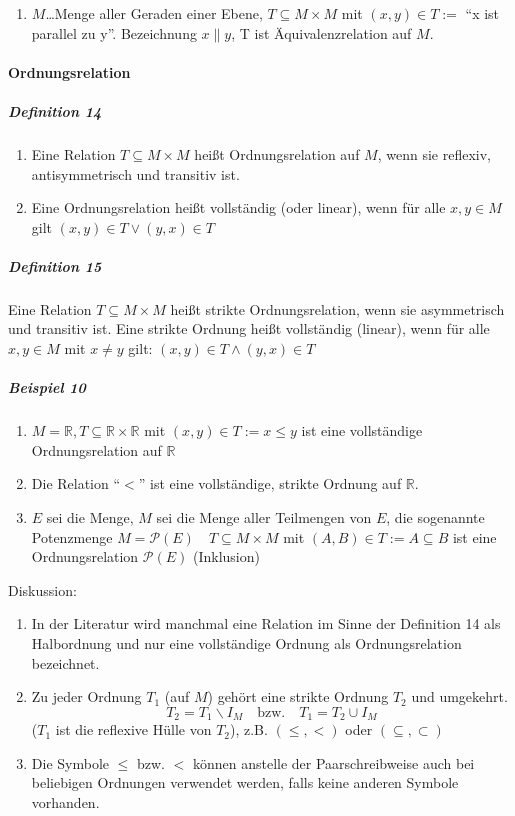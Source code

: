 \documentclass[a4paper]{scrartcl}
\begin{document}
\begin{enumerate}
\begin{enumerate}
\item $M$\dots Menge aller Geraden einer Ebene, $T\subseteq M \times M$ mit
$(x,y) \in T :=$ "`x ist parallel zu y"'.
Bezeichnung $x\parallel y$, T ist Äquivalenzrelation auf $M$.

\end{enumerate}
\end{enumerate}

\paragraph{Ordnungsrelation}%
\subparagraph{Definition 14}
\begin{enumerate}
\item Eine Relation $T \subseteq M \times M$ heißt Ordnungsrelation auf $M$, wenn sie reflexiv, antisymmetrisch und transitiv ist.
\item Eine Ordnungsrelation heißt vollständig (oder linear), wenn für alle $x,y \in M$ gilt $(x,y) \in T \vee (y,x) \in T$

\end{enumerate}

\subparagraph{Definition 15} Eine Relation $T \subseteq M \times M$ heißt strikte Ordnungsrelation, wenn sie asymmetrisch und transitiv ist. Eine strikte Ordnung heißt vollständig (linear), wenn für alle $x,y \in M$ mit $x\neq y$ gilt: $(x,y) \in T \wedge (y,x) \in T$

\subparagraph{Beispiel 10}
\begin{enumerate}
\item $M = \mathbb{R}, T \subseteq \mathbb{R} \times \mathbb{R}$ mit $(x,y)\in T := x \leq y$ ist eine vollständige Ordnungsrelation auf $\mathbb{R}$
\item Die Relation "`$<$"' ist eine vollständige, strikte Ordnung auf $\mathbb{R}$.
\item $E$ sei die Menge, $M$ sei die Menge aller Teilmengen von $E$, die sogenannte Potenzmenge $M = \mathcal P(E) \quad T \subseteq M \times M$ mit $(A,B) \in T := A\subseteq B$ ist eine Ordnungsrelation $\mathcal P(E)$ (Inklusion)

\end{enumerate}

Diskussion:
\begin{enumerate}
\item In der Literatur wird manchmal eine Relation im Sinne der Definition 14 als Halbordnung und nur eine vollständige Ordnung als Ordnungsrelation bezeichnet.
\item Zu jeder Ordnung $T_1$ (auf $M$) gehört eine strikte Ordnung $T_2$ und umgekehrt.
\[ T_2 = T_1 \backslash I_M \quad \text{bzw.} \quad T_1 = T_2 \cup I_M\]
($T_1$ ist die reflexive Hülle von $T_2$), z.B. $(\leq ,<)$ oder $(\subseteq , \subset )$
\item Die Symbole $\leq$ bzw. $<$ können anstelle der Paarschreibweise auch bei beliebigen Ordnungen verwendet werden, falls keine anderen Symbole vorhanden.

\end{enumerate}
\end{document}
